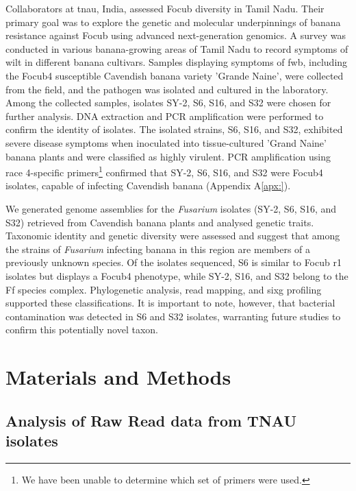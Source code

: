 Collaborators at \ac{tnau}, India, assessed \ac{Focub} diversity in Tamil Nadu. Their primary goal was to explore the genetic and molecular underpinnings of banana resistance against \ac{Focub} using advanced next-generation genomics. A survey was conducted in various banana-growing areas of Tamil Nadu to record symptoms of wilt in different banana cultivars. Samples displaying symptoms of \ac{fwb}, including the \ac{Focub4} susceptible Cavendish banana variety 'Grande Naine', were collected from the field, and the pathogen was isolated and cultured in the laboratory. Among the collected samples, isolates SY-2, S6, S16, and S32 were chosen for further analysis. DNA extraction and PCR amplification were performed to confirm the identity of isolates. The isolated strains, S6, S16, and S32, exhibited severe disease symptoms when inoculated into tissue-cultured 'Grand Naine' banana plants and were classified as highly virulent. PCR amplification using race 4-specific primers\footnote{We have been unable to determine which set of primers were used.} confirmed that SY-2, S6, S16, and S32 were \ac{Focub4} isolates, capable of infecting Cavendish banana (Appendix A\ref{apx:}).

\vbox{
We generated genome assemblies for the \textit{Fusarium} isolates  (SY-2, S6, S16, and S32) retrieved from Cavendish banana plants and analysed genetic traits. Taxonomic identity and genetic diversity were assessed and suggest that among the strains of \textit{Fusarium} infecting banana in this region are members of a previously unknown species. Of the isolates sequenced, S6 is similar to \ac{Focub} \ac{r1} isolates but displays a \ac{Focub4} phenotype, while SY-2, S16, and S32 belong to the \acf{Ff} species complex. Phylogenetic analysis, read mapping, and \ac{sixg} profiling supported these classifications. It is important to note, however, that bacterial contamination was detected in S6 and S32 isolates, warranting future studies to confirm this potentially novel taxon.}

\newpage
\section{Materials and Methods}

\subsection{Analysis of Raw Read data from TNAU isolates}

